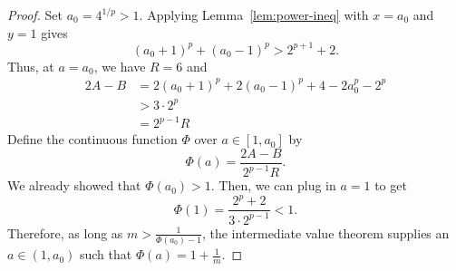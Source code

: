 \documentclass[10pt,a4paper]{amsart}
\begin{document}
\begin{proof}
Set $a_0=4^{1/p}>1$. Applying Lemma~\ref{lem:power-ineq} with
$x=a_0$ and $y=1$ gives
\[(a_0+1)^p+(a_0-1)^p>2^{p+1}+2.\]
Thus, at $a=a_0$, we have $R=6$ and
\begin{align*}
    2A-B &= 2(a_0+1)^p+2(a_0-1)^p+4-2a_0^p-2^p\\
    &> 3\cdot 2^p\\
    &= 2^{p-1}R
\end{align*}
Define the continuous function $\Phi$ over $a\in[1,a_0]$ by
\[\Phi(a)=\frac{2A-B}{2^{p-1}R}.\]
We already showed that $\Phi(a_0)>1$. Then, we can plug in $a=1$ to get
\[\Phi(1)=\frac{2^p+2}{3\cdot2^{p-1}}<1.\]
Therefore, as long as $m>\frac{1}{\Phi(a_0)-1}$, the intermediate value theorem supplies an $a\in(1,a_0)$ such that
$\Phi(a)=1+\frac{1}{m}$.
\end{proof}
\end{document}
